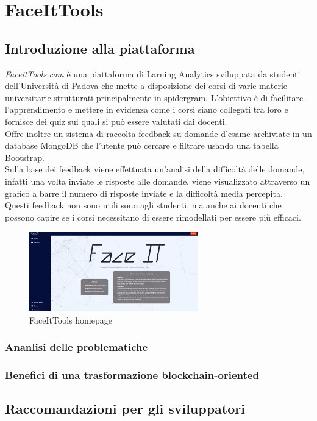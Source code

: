 \chapter{FaceItTools}
\section{Introduzione alla piattaforma}
\textit{FaceitTools.com} è una piattaforma di Larning Analytics sviluppata da studenti dell'Università di Padova che mette a disposizione dei corsi di varie materie universitarie strutturati principalmente in spidergram.
L'obiettivo è di facilitare l'apprendimento e mettere in evidenza come i corsi siano collegati tra loro e fornisce dei quiz sui quali si può essere valutati dai docenti.
\\Offre inoltre un sistema di raccolta feedback su domande d'esame archiviate in un database MongoDB che l’utente può cercare e filtrare usando una tabella Bootstrap.
\\Sulla base dei feedback viene effettuata un'analisi della difficoltà delle domande, infatti una volta inviate le risposte alle domande, viene visualizzato attraverso un grafico a barre il numero di risposte inviate e la difficoltà media percepita.
\\Questi feedback non sono utili sono agli studenti, ma anche ai docenti che possono capire se i corsi necessitano di essere rimodellati per essere più efficaci.
\begin{figure}[h]
    \centering
    \includegraphics[width=0.65\textwidth]{Immagini/FaceItTools.PNG}
    \caption{FaceItTools homepage}
\end{figure}
\subsection{Ananlisi delle problematiche}
\subsection{Benefici di una trasformazione blockchain-oriented}
\section{Raccomandazioni per gli sviluppatori}